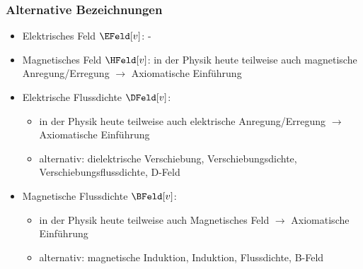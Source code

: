\begin{frame}
  \frametitle{Alternative Bezeichnungen}
  \begin{itemize}[<+->]
    \item Elektrisches Feld $\EFeld[v]$: - 
    \item Magnetisches Feld $\HFeld[v]$: in der Physik heute
      teilweise auch \alert{magnetische Anregung/Erregung} $\to$ Axiomatische
      Einführung
    \item Elektrische Flussdichte $\DFeld[v]$:
      \begin{itemize}[<+->]
        \item in der Physik heute
      teilweise auch \alert{elektrische Anregung/Erregung} $\to$ Axiomatische
      Einführung
      \item alternativ: \alert{dielektrische Verschiebung,
          Verschiebungsdichte, Verschiebungsflussdichte, D-Feld}
        \end{itemize}
      \item Magnetische Flussdichte $\BFeld[v]$:
        \begin{itemize}[<+->]
          \item in der Physik heute
      teilweise auch \alert{Magnetisches Feld} $\to$ Axiomatische Einführung
      \item alternativ:
        \alert{magnetische Induktion, Induktion, Flussdichte, B-Feld}
        \end{itemize}
  \end{itemize}    
      
  \end{frame}

